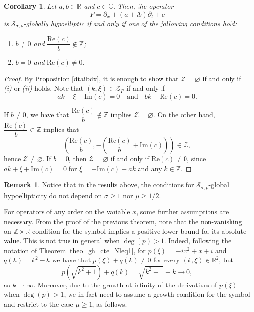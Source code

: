 \documentclass[11pt,reqno]{amsart}
\numberwithin{equation}{section}
\newtheorem{corollary}[theorem]{Corollary}
\theoremstyle{definition}
\newtheorem{obs}{Remark}
\theoremstyle{definition}
\newcommand{\R}{\mathbb{R}}
\newcommand{\Z}{\mathbb{Z}}
\newcommand{\Real}{\mathrm{Re}}
\newcommand{\Imag}{\mathrm{Im}}
\begin{document}
    
\begin{corollary}\label{gh_const}
    Let $a,b\in\R$ and $c\in\mathbb{C}$. Then, the operator
    \[P=\partial_x+(a+ib)\partial_t+c\]
    is $\mathcal{S}_{\sigma,\mu}$-globally hypoelliptic if and only if one of the following conditions hold:
    \begin{enumerate}
        \item[(i)] $b\neq 0$ and $\dfrac{\Real(c)}{b}\notin\mathbb{Z}$;
        \item[(ii)] $b=0$ and $\Real(c)\neq 0$.
    \end{enumerate}
\end{corollary}
\begin{proof}
    By Proposition \ref{dtaibdx}, it is enough to show that $\mathcal{Z}=\varnothing$ if and only if {\it (i)} or {\it (ii)} holds.
   Note that $(k,\xi)\in\mathcal{Z}_P$ if and only if 
    \[ak+\xi+\Imag(c)=0\quad\text{and}\quad bk-\Real(c)=0.\]
    
    If $b\neq 0$, we have that $\dfrac{\Real(c)}{b}\notin\mathbb{Z}$ implies $\mathcal{Z}=\varnothing$. On the other hand, $\dfrac{\Real(c)}{b}\in\mathbb{Z}$ implies that
    \[\left(\frac{\Real(c)}{b},-\left(\frac{\Real(c)}{b}+\Imag(c)\right)\right)\in\mathcal{Z},\]
    hence $\mathcal{Z}\neq \varnothing$. If $b=0$, then $\mathcal{Z}=\varnothing$ if and only if $\Real(c)\neq 0$, since  $ak+\xi+\Imag(c)=0$ for $\xi=-\Imag(c)-ak$ and any $k\in\Z$. 
\end{proof}


\begin{obs}\label{not_sigma}
    Notice that in the results above, the conditions for $\mathcal{S}_{\sigma,\mu}$-global hypoellipticity do not depend on $\sigma\geq 1$ nor $\mu\geq 1/2$.
\end{obs}


For operators of any order on the variable $x$, some further assumptions are necessary. From the proof of the previous theorem, note that the non-vanishing on $\Z\times \R$ condition for the symbol implies a positive lower bound for its absolute value. This is not true in general when $\deg(p)>1$. Indeed, following the notation of Theorem \ref{theo_gh_cte_Nleq1}, for $p(\xi)=-ix^2+x+i$ and $q(k)=k^2-k$ we have that $p(\xi)+q(k)\neq 0$ for every $(k,\xi)\in\R^2$, but
\begin{equation*}
    p(\sqrt{k^2+1})+q(k)=\sqrt{k^2+1}-k\to 0,
\end{equation*}
as $k\to \infty$. Moreover, due to the growth at infinity of the derivatives of $p(\xi)$ when $\deg(p)>1$, we in fact need to assume a growth condition for the symbol and restrict to the case $\mu\geq 1$, as follows.
\end{document}
